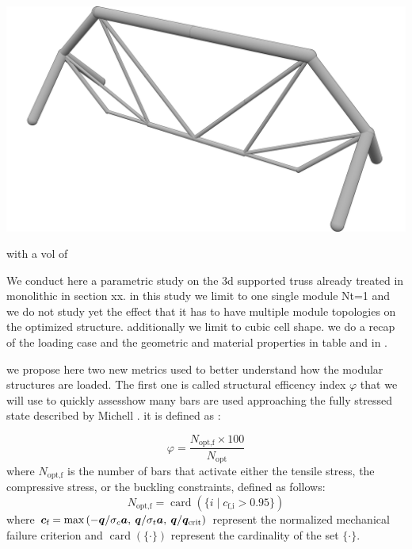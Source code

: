 \begin{marginfigure}
    \centering
    \includegraphics[width=\linewidth]{figures/04_TTO_improvements/16_supported_3D_sol/04_Topology_NLP_iso-min.png}
    \caption{with a vol of}
    \label{fig:05}
\end{marginfigure}
We conduct here a parametric study on the 3d supported truss already treated in monolithic in section xx. in this study we limit to one single module Nt=1 and we do not study yet the effect that it has to have multiple module topologies on the optimized structure. additionally we limit to cubic cell shape. we do a recap of the loading case and the geometric and material properties in table and in .

we propose here two new metrics used to better understand how the modular structures are loaded. The first one is called structural efficency index $\varphi$ that we will use to quickly assesshow many bars are used approaching the fully stressed state described by Michell . it is defined as :

\begin{equation}
    \varphi = \frac{N_\text{opt,f}\times100}{N_\text{opt}}
\end{equation}
where $N_\text{opt,f}$ is the number of bars that activate either the tensile stress, the compressive stress, or the buckling constraints, defined as follows:
\begin{equation}
    N_\text{opt,f} = \operatorname{card}(\{i\;|\;c_\text{f,i} > 0.95\})
\end{equation}
where $\bm{c}_\text{f}=\max{\left(-\bm{q} /\sigma_c \bm{a},\:\bm{q} /\sigma_t \bm{a},\:\bm{q}/\bm{q}_{\text{crit}}\right)}$ represent the normalized mechanical failure criterion and $\operatorname{card}(\{\cdot\})$ represent the cardinality of the set $\{\cdot\}$.

